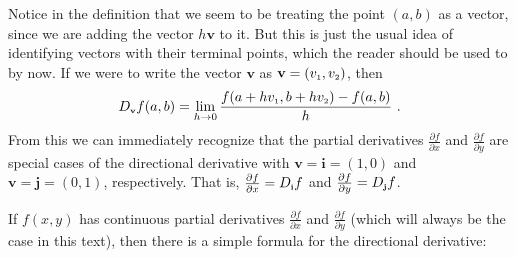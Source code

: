 
Notice in the definition that we seem to be treating the point $(a,b)$ as a vector, since we are adding the
vector $h\mathbf{v}$ to it. But this is just the usual idea of identifying vectors with their terminal points, which
the reader should be used to by now. If we were to write the vector $\mathbf{v}$ as $\mathbf{v} = (v_{\scriptscriptstyle 1},v_{\scriptscriptstyle 2})$, then
\begin{equation}\label{eqn:dirderivpt}
 D_{\scriptscriptstyle \mathbf{v}}f(a,b) = \lim_{h \to 0} \dfrac{f(a+hv_{\scriptscriptstyle 1},b+hv_{\scriptscriptstyle 2}) - f(a,b)}{h} ~.
\end{equation}
From this we can immediately recognize that the partial derivatives $\tfrac{\partial f}{\partial x}$ and
$\tfrac{\partial f}{\partial y}$ are special cases of the directional derivative with $\mathbf{v} = \mathbf{i} = (1,0)$
and $\mathbf{v} = \mathbf{j} = (0,1)$, respectively. 
That is, $\tfrac{\partial f}{\partial x} = D_{\scriptscriptstyle \mathbf{i}}f$
and $\tfrac{\partial f}{\partial y} = D_{\scriptscriptstyle \mathbf{j}}f$. 

If $f(x,y)$ has continuous partial derivatives $\tfrac{\partial f}{\partial x}$ and
$\tfrac{\partial f}{\partial y}$ (which will always be the case in this text), then there is a simple formula for the
directional derivative:

